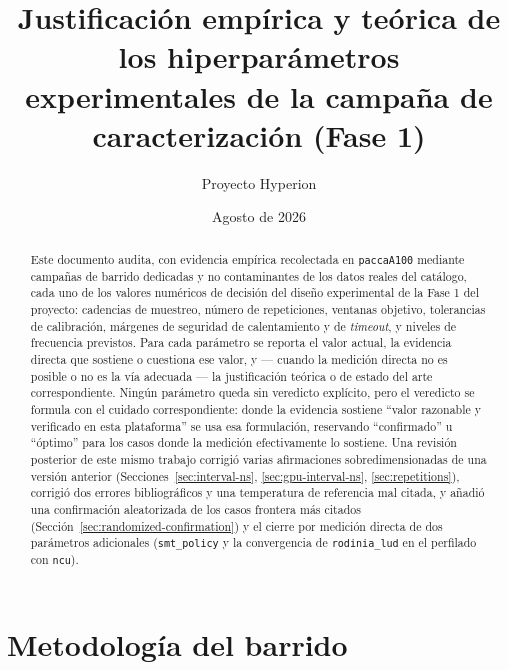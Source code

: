 \documentclass[11pt]{article}
\title{Justificación empírica y teórica de los hiperparámetros \\ experimentales de la campaña de caracterización (Fase 1)}
\author{Proyecto Hyperion}
\date{Agosto de 2026}
\begin{document}
\maketitle

\begin{abstract}
Este documento audita, con evidencia empírica recolectada en \texttt{paccaA100}
mediante campañas de barrido dedicadas y no contaminantes de los datos reales
del catálogo, cada uno de los valores numéricos de decisión del diseño
experimental de la Fase 1 del proyecto: cadencias de muestreo, número de
repeticiones, ventanas objetivo, tolerancias de calibración, márgenes de
seguridad de calentamiento y de \textit{timeout}, y niveles de frecuencia
previstos. Para cada parámetro se reporta el valor actual, la evidencia
directa que sostiene o cuestiona ese valor, y --- cuando la medición directa no
es posible o no es la vía adecuada --- la justificación teórica o de estado
del arte correspondiente. Ningún parámetro queda sin veredicto explícito,
pero el veredicto se formula con el cuidado correspondiente: donde la
evidencia sostiene ``valor razonable y verificado en esta plataforma'' se
usa esa formulación, reservando ``confirmado'' u ``óptimo'' para los casos
donde la medición efectivamente lo sostiene. Una revisión posterior de este
mismo trabajo corrigió varias afirmaciones sobredimensionadas de una
versión anterior (Secciones~\ref{sec:interval-ns},
\ref{sec:gpu-interval-ns}, \ref{sec:repetitions}), corrigió dos errores
bibliográficos y una temperatura de referencia mal citada, y añadió una
confirmación aleatorizada de los casos frontera más citados
(Sección~\ref{sec:randomized-confirmation}) y el cierre por medición
directa de dos parámetros adicionales (\texttt{smt\_policy} y la
convergencia de \texttt{rodinia\_lud} en el perfilado con \texttt{ncu}).
\end{abstract}

\tableofcontents
\clearpage

\section{Metodología del barrido}
\label{sec:metodologia}
\end{document}

